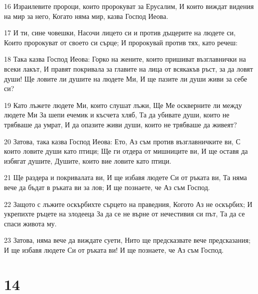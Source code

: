 \par 16 Израилевите пророци, които пророкуват за Ерусалим, И които виждат видения на мир за него, Когато няма мир, казва Господ Иеова.
\par 17 И ти, сине човешки, Насочи лицето си и против дъщерите на людете си, Които пророкуват от своето си сърце; И пророкувай против тях, като речеш:
\par 18 Така казва Господ Иеова: Горко на жените, които пришиват възглавнички на всеки лакът, И правят покривала за главите на лица от всякакъв ръст, за да ловят души! Ще ловите ли душите на людете Ми, И ще пазите ли души живи за себе си?
\par 19 Като лъжете людете Ми, които слушат лъжи, Ще Ме оскверните ли между людете Ми За шепи ечемик и късчета хляб, Та да убивате души, които не трябваше да умрат, И да опазите живи души, които не трябваше да живеят?
\par 20 Затова, така казва Господ Иеова: Ето, Аз съм против възглавничките ви, С които ловите души като птици; Ще ги отдера от мишниците ви, И ще оставя да избягат душите, Душите, които вие ловите като птици.
\par 21 Ще раздера и покривалата ви, И ще избавя людете Си от ръката ви, Та няма вече да бъдат в ръката ви за лов; И ще познаете, че Аз съм Господ.
\par 22 Защото с лъжите оскърбихте сърцето на праведния, Когото Аз не оскърбих; И укрепихте ръцете на злодееца За да се не върне от нечестивия си път, Та да се спаси живота му.
\par 23 Затова, няма вече да виждате суети, Нито ще предсказвате вече предсказания; И ще избавя людете Си от ръката ви! И ще познаете, че Аз съм Господ.

\chapter{14}

